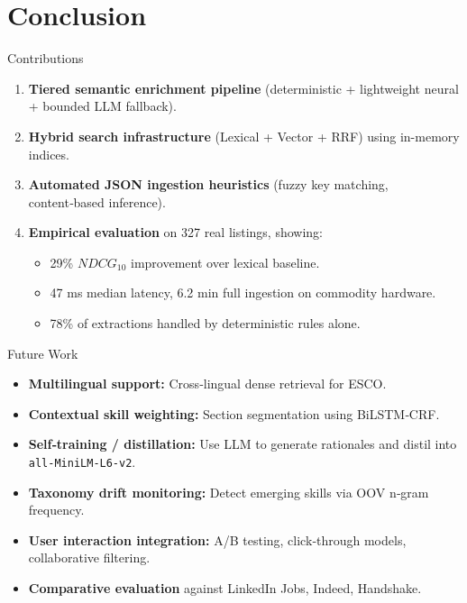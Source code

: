 \documentclass[aspectratio=169, 10pt]{beamer}
\begin{document}
\section{Conclusion}

\begin{frame}{Contributions}
\begin{enumerate}
\item \textbf{Tiered semantic enrichment pipeline} (deterministic + lightweight neural + bounded LLM fallback).
\item \textbf{Hybrid search infrastructure} (Lexical + Vector + RRF) using in-memory indices.
\item \textbf{Automated JSON ingestion heuristics} (fuzzy key matching, content‑based inference).
\item \textbf{Empirical evaluation} on 327 real listings, showing:
\begin{itemize}
\item 29\% $NDCG_{10}$ improvement over lexical baseline.
\item 47 ms median latency, 6.2 min full ingestion on commodity hardware.
\item 78\% of extractions handled by deterministic rules alone.
\end{itemize}
\end{enumerate}
\end{frame}

\begin{frame}{Future Work}
\begin{itemize}
\item \textbf{Multilingual support:} Cross‑lingual dense retrieval for ESCO.
\item \textbf{Contextual skill weighting:} Section segmentation using BiLSTM‑CRF.
\item \textbf{Self‑training / distillation:} Use LLM to generate rationales and distil into \texttt{all-MiniLM-L6-v2}.
\item \textbf{Taxonomy drift monitoring:} Detect emerging skills via OOV n‑gram frequency.
\item \textbf{User interaction integration:} A/B testing, click‑through models, collaborative filtering.
\item \textbf{Comparative evaluation} against LinkedIn Jobs, Indeed, Handshake.
\end{itemize}
\end{frame}
\end{document}
